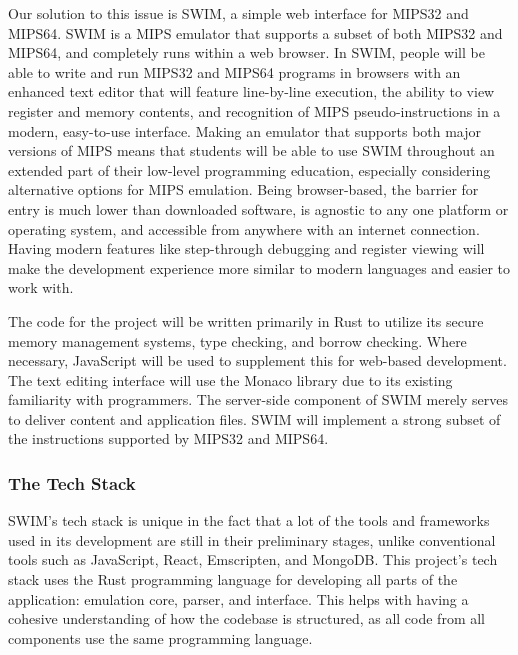 \documentclass[
    paper=letter,
    parskip=half,
    fontsize=12pt,
    titlepage=firstiscover,
    toc=bibliography,
    numbers=endperiod
]{scrartcl}
\begin{document}
Our solution to this issue is SWIM, a simple web interface for MIPS32
and MIPS64. SWIM is a MIPS emulator that supports a subset of both
MIPS32 and MIPS64, and completely runs within a web browser. In SWIM,
people will be able to write and run MIPS32 and MIPS64 programs in
browsers with an enhanced text editor that will feature line-by-line
execution, the ability to view register and memory contents, and
recognition of MIPS pseudo-instructions in a modern, easy-to-use
interface. Making an emulator that supports both major versions of MIPS
means that students will be able to use SWIM throughout an extended part
of their low-level programming education, especially considering
alternative options for MIPS emulation. Being browser-based, the barrier
for entry is much lower than downloaded software, is agnostic to any one
platform or operating system, and accessible from anywhere with an
internet connection. Having modern features like step-through debugging
and register viewing will make the development experience more similar
to modern languages and easier to work with.

The code for the project will be written primarily in Rust
\cite{rust-book} to utilize its secure memory management systems, type
checking, and borrow checking. Where necessary, JavaScript will be used
to supplement this for web-based development. The text editing interface
will use the Monaco library \cite{monaco} due to its existing
familiarity with programmers. The server-side component of SWIM merely
serves to deliver content and application files. SWIM will implement a
strong subset of the instructions supported by MIPS32 and MIPS64.

\subsubsection{The Tech Stack}
SWIM's tech stack is unique in the fact that a lot of the tools and
frameworks used in its development are still in their preliminary
stages, unlike conventional tools such as JavaScript, React, Emscripten,
and MongoDB. This project's tech stack uses the Rust programming
language for developing all parts of the application: emulation core,
parser, and interface. This helps with having a cohesive understanding
of how the codebase is structured, as all code from all components use
the same programming language.
\end{document}
